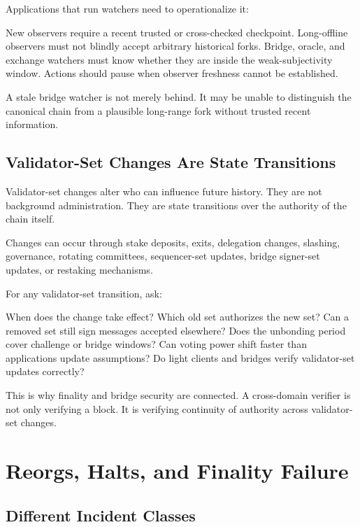 Applications that run watchers need to operationalize it:

\begin{codeblock}
New observers require a recent trusted or cross-checked checkpoint.
Long-offline observers must not blindly accept arbitrary historical forks.
Bridge, oracle, and exchange watchers must know whether they are inside
the weak-subjectivity window.
Actions should pause when observer freshness cannot be established.
\end{codeblock}

A stale bridge watcher is not merely behind. It may be unable to distinguish the canonical chain from a plausible long-range fork without trusted recent information.

\subsection{Validator-Set Changes Are State Transitions}

Validator-set changes alter who can influence future history. They are not background administration. They are state transitions over the authority of the chain itself.

Changes can occur through stake deposits, exits, delegation changes, slashing, governance, rotating committees, sequencer-set updates, bridge signer-set updates, or restaking mechanisms.

For any validator-set transition, ask:

\begin{codeblock}
When does the change take effect?
Which old set authorizes the new set?
Can a removed set still sign messages accepted elsewhere?
Does the unbonding period cover challenge or bridge windows?
Can voting power shift faster than applications update assumptions?
Do light clients and bridges verify validator-set updates correctly?
\end{codeblock}

This is why finality and bridge security are connected. A cross-domain verifier is not only verifying a block. It is verifying continuity of authority across validator-set changes.

\section{Reorgs, Halts, and Finality Failure}

\subsection{Different Incident Classes}

